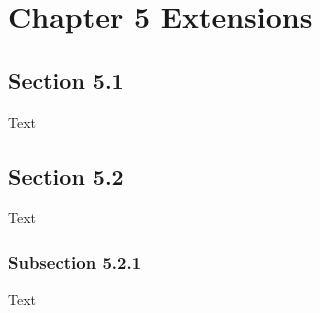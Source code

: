 \chapter{Chapter 5 Extensions}


\section{Section 5.1}
Text \\




\section{Section 5.2}
Text\\




\subsection{Subsection 5.2.1}
Text\\
